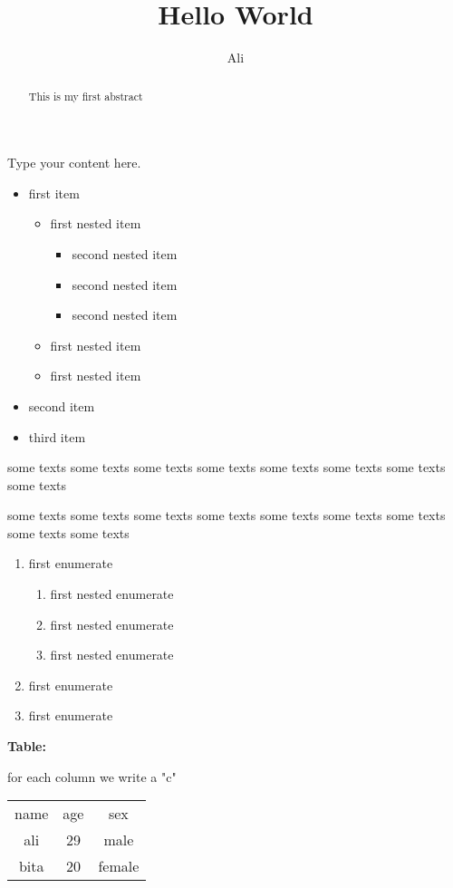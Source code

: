 \documentclass{article}
\title{Hello World}
\author{Ali}
\begin{document}
\maketitle

\begin{abstract}
This is my first abstract
\end{abstract}
Type your content here.

\begin{itemize}
\item first item
	\begin{itemize}
	\item first nested item
		\begin{itemize}
		\item second nested item
		\item second nested item
		\item second nested item
		\end{itemize}
	\item first nested item
	\item first nested item
	\end{itemize}
\item second item
\item third item
\end{itemize}
some texts some texts some texts some texts some texts some texts some texts some texts 

some texts some texts some texts some texts some texts some texts some texts some texts some texts 

\begin{enumerate}
\item first enumerate
	\begin{enumerate}
	\item first nested enumerate
	\item first nested enumerate
	\item first nested enumerate
	\end{enumerate}
\item first enumerate
\item first enumerate
\end{enumerate}

\textbf{Table:}

for each column we write a "c"

\begin{tabular}{ccc}
name & age & sex\\
ali & 29 & male\\
bita & 20& female
\end{tabular}
\end{document}
